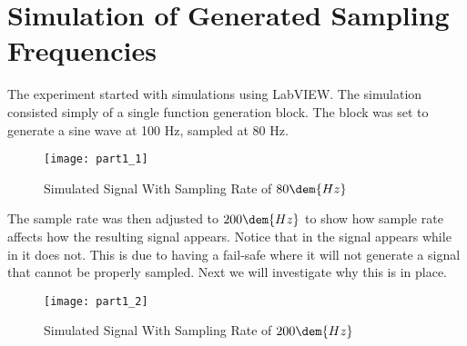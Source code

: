 \documentclass[a4paper,titlepage]{article}
\begin{document}
\section{Simulation of Generated Sampling Frequencies}
The experiment started with simulations using LabVIEW. The simulation
consisted simply of a single function generation block. The block was set to
generate a sine wave at 100 Hz, sampled at 80 Hz. 

\begin{figure}[H]
	\begin{center}
		\texttt{[image: part1\_1]}
	\end{center}
	\caption{Simulated Signal With Sampling Rate of $80\dem{Hz}$}
	\label{fig:part1_1}
\end{figure}

The sample rate was then adjusted to $200\dem{Hz}$ to show how sample rate
affects how the resulting signal appears. Notice that in  the
signal appears while in  it does not. This is due to \Labview
having a fail-safe where it will not generate a signal that cannot be properly
sampled. Next we will investigate why this is in place.

\begin{figure}[H]
	\begin{center}
		\texttt{[image: part1\_2]}
	\end{center}
	\caption{Simulated Signal With Sampling Rate of $200\dem{Hz}$}
	\label{fig:part1_2}
\end{figure}
\end{document}
